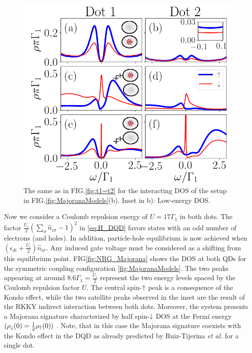 \documentclass[showpacs,aps,prb,reprint,superscriptaddress]{revtex4-1}
\begin{document}
\begin{figure}[bt]
\begin{center}
\includegraphics[scale=0.45]{Graficos/b)Nt1>0.png}
\caption{  \label{fig:Nt1>0} The same as in FIG.\ref{fig:t1=t2} for the  interacting DOS of the setup in FIG.\ref{fig:MajoranaModels}(b). Inset in b): Low-energy DOS. 
}
%
\end{center}
\end{figure}




    

    Now we consider a Coulomb repulsion energy of $U = 17\Gamma_1$ in both dots. The factor $ \frac{U_i}{2}(\sum_{\sigma} \hat{n}_{i\sigma}-1)^{2}$ in \eqref{eq:H_DQD} favors states with an odd number of electrons (and holes). In addition, particle-hole equilibrium is now achieved when $\left(\epsilon_{di}+\frac{U_i}{2}\right)\hat{n}_{i\sigma}$.  Any induced gate voltage must be considered as a shifting from this equilibrium point. FIG\ref{fig:NRG_Majorana} shows the DOS at both QDs for the symmetric coupling configuration \ref{fig:MajoranaModels}. The two peaks appearing at around $8.6\Gamma_1 = \frac{U_i}{2}$ represent the two energy levels spaced by the Coulomb repulsion factor $U$. The central spin-$\uparrow$ peak is a consequence of the Kondo effect, \cite{hewson_kondo_1997,wilson_renormalization_1975}  while the two satellite peaks observed in the inset  are the result of the  RKKY indirect interaction between both dots.  \cite{ruderman_indirect_1954,kasuya_theory_1956,yosida_magnetic_1957} Moreover, the system presents a Majorana signature characterized by half spin-$\downarrow$ DOS at the Fermi energy $(\rho_\downarrow(0) = \frac{1}{2}\rho_\uparrow(0))$  . Note, that in this case the Majorana signature coexists with the Kondo effect in the DQD as already predicted by Ruiz-Tijerina \textit{et al.} for a single dot. \cite{ruiz-tijerina_interaction_2015}
\end{document}
